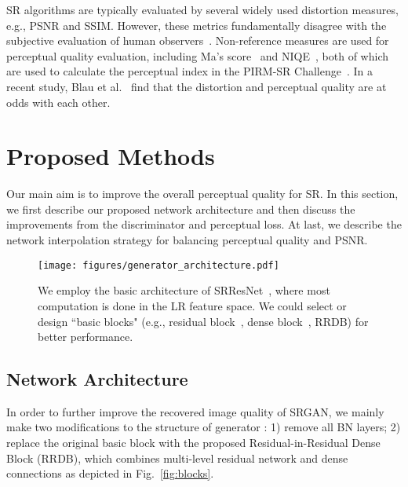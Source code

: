 \documentclass[runningheads]{llncs}
\begin{document}
SR algorithms are typically evaluated by several widely used distortion measures, e.g., PSNR and SSIM.
However, these metrics fundamentally disagree with the subjective evaluation of human observers~\cite{ledig2017photo}.
Non-reference measures are used for perceptual quality evaluation, including Ma's score~\cite{ma2017learning} 
and NIQE~\cite{mittal2013making}, both of which are used to calculate the perceptual index in the PIRM-SR 
Challenge~\cite{pirm18url}.
In a recent study, Blau et al.~\cite{blau2017perception} find that the distortion and perceptual quality are at odds 
with each other. 


\section{Proposed Methods}

Our main aim is to improve the overall perceptual quality for SR. 
In this section, we first describe our proposed network architecture and then discuss the improvements from the 
discriminator and perceptual loss.
At last, we describe the network interpolation strategy for balancing perceptual quality and PSNR.


\begin{figure}[htbp]
	\vspace{-0.3cm}
	\begin{center}
		\texttt{[image: figures/generator\_architecture.pdf]}
	\end{center}
	\vspace{-0.4cm}
	\caption{We employ the basic architecture of SRResNet~\cite{ledig2017photo}, where most computation is done in the 
		LR feature space. We could select or design ``basic blocks" (e.g., residual block~\cite{he2016deep}, dense
		block~\cite{huang2016densely}, RRDB) for better performance.}
	\label{fig:generator_architecture}
	\vspace{-0.8cm}
\end{figure}

\subsection{Network Architecture}
In order to further improve the recovered image quality of SRGAN, we mainly make two modifications to the structure 
of generator : 
1) remove all BN layers; 
2) replace the original basic block with the proposed Residual-in-Residual Dense Block (RRDB), which combines 
multi-level residual network and dense connections as depicted in Fig.~\ref{fig:blocks}.
\end{document}
